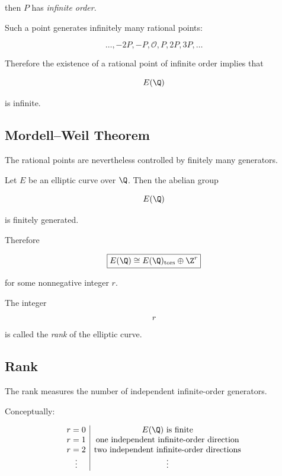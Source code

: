 then \(P\) has \emph{infinite order}.

Such a point generates infinitely many rational points:

\[ \ldots,-2P,-P,\mathcal O,P,2P,3P,\ldots \]

Therefore the existence of a rational point of infinite order implies that

\[ E(\Q) \]

is infinite.

\subsection{Mordell--Weil Theorem}
\label{subsec:mordell-weil-theorem}

The rational points are nevertheless controlled by finitely many generators.

\begin{theorem}
Let \(E\) be an elliptic curve over \(\Q\). Then the abelian group

\[ E(\Q) \]

is finitely generated.
\end{theorem}

Therefore

\[ \boxed{E(\Q)\cong E(\Q)_{\mathrm{tors}}\oplus\Z^r} \]

for some nonnegative integer \(r\).

The integer

\[ r \]

is called the \emph{rank} of the elliptic curve.

\subsection{Rank}
\label{subsec:elliptic-curve-rank}

The rank measures the number of independent infinite-order generators.

Conceptually:

\[
\begin{array}{c|c}
r=0 & E(\Q)\text{ is finite}\\
r=1 & \text{one independent infinite-order direction}\\
r=2 & \text{two independent infinite-order directions}\\
\vdots & \vdots
\end{array}
\]

